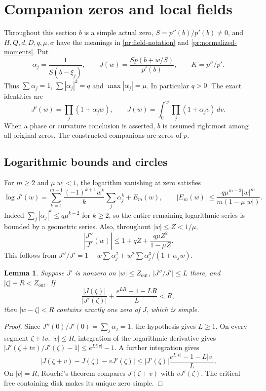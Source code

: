 \documentclass[11pt,reqno]{amsart}
\numberwithin{equation}{section}
\newtheorem{lemma}[theorem]{Lemma}
\theoremstyle{definition}
\theoremstyle{remark}
\begin{document}
\section{Companion zeros and local fields}\label{sec:local-tools}

Throughout this section $b$ is a simple actual zero, $S=p''(b)/p'(b)\ne0$,
and $H,Q,d,D,q,\mu,\sigma$ have the meanings in
\eqref{pr:field-notation} and \eqref{pr:normalized-moments}. Put
\[
 \alpha_j=\frac1{S(b-\xi_j)},\qquad
 J(w)=\frac{S p(b+w/S)}{p'(b)},\qquad K=p''/p'.
\]
Thus $\sum\alpha_j=1$, $\sum|\alpha_j|^2=q$ and
$\max|\alpha_j|=\mu$. In particular $q>0$. The exact identities are
\begin{equation}\label{lt:finite-product}
 J'(w)=\prod_j(1+\alpha_jw),\qquad
 J(w)=\int_0^w\prod_j(1+\alpha_jv)\,dv.
\end{equation}
When a phase or curvature conclusion is asserted, $b$ is assumed
rightmost among all original zeros. The constructed companions are
zeros of $p$.

\subsection{Logarithmic bounds and circles}

For $m\ge2$ and $\mu|w|<1$, the logarithm vanishing at zero satisfies
\begin{equation}\label{lt:log-tail}
 \log J'(w)=\sum_{k=1}^{m-1}\frac{(-1)^{k+1}w^k}{k}
                    \sum_j\alpha_j^k+E_m(w),\qquad
 |E_m(w)|\le\frac{q\mu^{m-2}|w|^m}{m(1-\mu|w|)}.
\end{equation}
Indeed $\sum_j|\alpha_j|^k\le q\mu^{k-2}$ for $k\ge2$, so the
entire remaining logarithmic series is bounded by a geometric series.
Also, throughout $|w|\le Z<1/\mu$,
\begin{equation}\label{lt:log-derivative}
 \left|\frac{J''}{J'}(w)\right|
 \le1+qZ+\frac{q\mu Z^2}{1-\mu Z}.
\end{equation}
This follows from
$J''/J'=1-w\sum\alpha_j^2+w^2\sum\alpha_j^3/(1+\alpha_jw)$.

\begin{lemma}\label{lt:circle}
Suppose $J'$ is nonzero on $|w|\le Z_{\mathrm{out}}$,
$|J''/J'|\le L$ there, and $|\zeta|+R<Z_{\mathrm{out}}$. If
\[
 \frac{|J(\zeta)|}{|J'(\zeta)|}
       +\frac{e^{LR}-1-LR}{L}<R,
\]
then $|w-\zeta|<R$ contains exactly one zero of $J$, which is simple.
\end{lemma}
\begin{proof}
Since $J''(0)/J'(0)=\sum_j\alpha_j=1$, the hypothesis gives $L\ge1$.
On every segment $\zeta+tv$, $|v|\le R$, integration of the
logarithmic derivative gives
$|J'(\zeta+tv)/J'(\zeta)-1|\le e^{Lt|v|}-1$.
A further integration gives
\[
 |J(\zeta+v)-J(\zeta)-vJ'(\zeta)|
 \le |J'(\zeta)|\frac{e^{L|v|}-1-L|v|}{L}.
\]
On $|v|=R$, Rouch\'e's theorem compares
$J(\zeta+v)$ with $vJ'(\zeta)$. The critical-free containing disk
makes its unique zero simple.
\end{proof}
\end{document}
